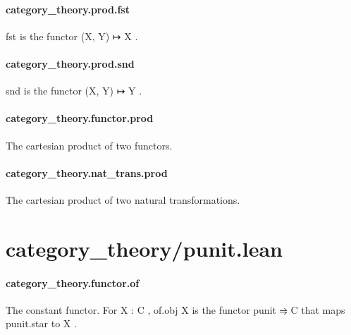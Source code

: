 \documentclass{article}
\begin{document}
\paragraph{category\_theory.prod.fst}
\par
\colorbox[RGB]{253,246,227}{{{{\color[RGB]{101, 123, 131} fst }}}} is the functor 
\colorbox[RGB]{253,246,227}{{{{\color[RGB]{101, 123, 131} (X, Y) ↦ X }}}}.
\paragraph{category\_theory.prod.snd}
\par
\colorbox[RGB]{253,246,227}{{{{\color[RGB]{101, 123, 131} snd }}}} is the functor 
\colorbox[RGB]{253,246,227}{{{{\color[RGB]{101, 123, 131} (X, Y) ↦ Y }}}}.
\paragraph{category\_theory.functor.prod}
\par
The cartesian product of two functors.
\paragraph{category\_theory.nat\_trans.prod}
\par
The cartesian product of two natural transformations.
\section{category\_theory/punit.lean}\paragraph{category\_theory.functor.of}
\par
The constant functor. For 
\colorbox[RGB]{253,246,227}{{{{\color[RGB]{101, 123, 131} X : C }}}}, 
\colorbox[RGB]{253,246,227}{{{{\color[RGB]{101, 123, 131} of.obj X }}}} is the functor 
\colorbox[RGB]{253,246,227}{{{{\color[RGB]{101, 123, 131} punit ⥤ C }}}}that maps 
\colorbox[RGB]{253,246,227}{{{{\color[RGB]{101, 123, 131} punit.star }}}} to 
\colorbox[RGB]{253,246,227}{{{{\color[RGB]{101, 123, 131} X }}}}.
\end{document}
